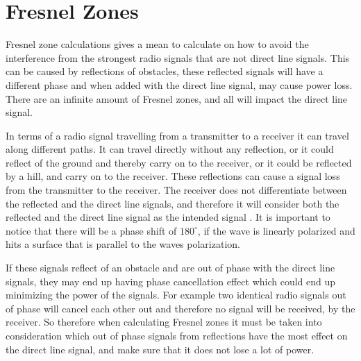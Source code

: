 \chapter{Fresnel Zones}
\label{fres_zone}


Fresnel zone \citep{Fres1} \citep{Fres2} calculations gives a mean to calculate on how to avoid the interference from the strongest radio signals that are not direct line signals. This can be caused by reflections of obstacles, these reflected signals will have a different phase and when added with the direct line signal, may cause power loss. There are an infinite amount of Fresnel zones, and all will impact the direct line signal.  %


In terms of a radio signal travelling from a transmitter to a receiver it can travel along different paths. It can travel directly without any reflection, %
or it could reflect of the ground and thereby carry on to the receiver, or it could be reflected by a hill, and carry on to the receiver. %
These reflections can cause a signal loss from the transmitter to the receiver. The receiver does not differentiate between the reflected and the direct line signals, and therefore it will consider both the reflected and the direct line signal as the intended signal \citep{Fres2}. It is important to notice that there will be a phase shift of $180^{\circ}$, if the wave is linearly polarized and hits a surface that is parallel to the waves polarization. 


If these signals reflect of an obstacle and are out of phase with the direct line signals, they may end up having phase cancellation effect which could end up minimizing the power of the signals. For example two identical radio signals out of phase will cancel each other out and therefore no signal will be received, by the receiver. So therefore when calculating Fresnel zones it must be taken into consideration which out of phase signals from reflections have the most effect on the direct line signal, and make sure that it does not lose a lot of power. 

